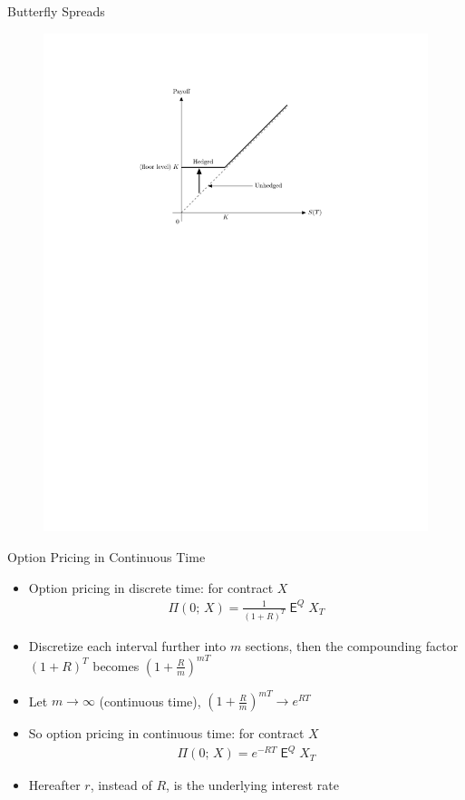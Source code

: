 \documentclass[10pt,handout]{beamer}
\DeclareMathOperator\expc{\mathsf{E}}
\theoremstyle{definition}
\begin{document}
\begin{frame}{Butterfly Spreads}
\begin{figure}[!htbp]
    \includegraphics[scale=0.58,page=17]{fig/note08/lo.pdf}
  \end{figure}
\end{frame}

\begin{frame}{Option Pricing in Continuous Time}
  \begin{itemize}
    \item Option pricing in discrete time: for contract $X$ 
      \begin{align*}
        \Pi(0;\,X) = \frac{1}{(1 + R)^T}\expc^Q{X_T}
      \end{align*}
    \item Discretize each interval further into $m$ sections, then the compounding factor $(1 + R)^T$ becomes $(1 + \frac{R}m)^{mT}$
    \item Let $m\to\infty$ (continuous time), $(1 + \frac{R}m)^{mT}\to e^{RT}$
    \item So option pricing in continuous time: for contract $X$ 
      \begin{align*}
        \Pi(0;\,X) = e^{-RT}\expc^Q{X_T}
      \end{align*}
    \item Hereafter $r$, instead of $R$, is the underlying interest rate 
  \end{itemize}
\end{frame}
\end{document}
